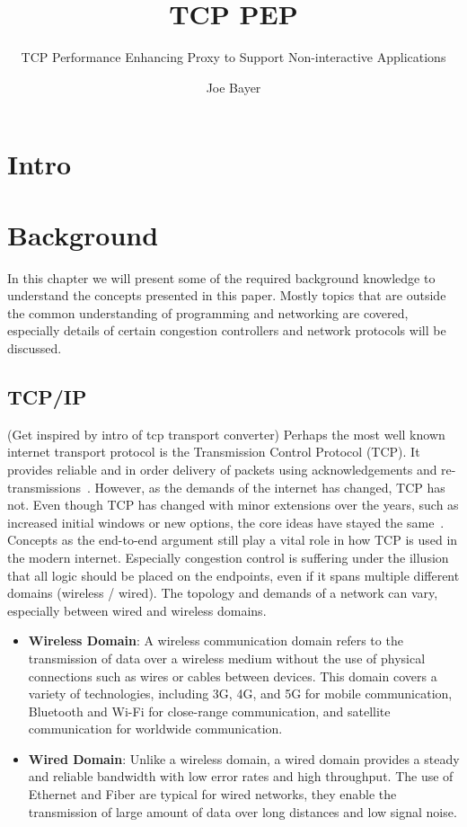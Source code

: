 \documentclass[a4paper,english, 11pt]{report}
\author{Joe Bayer}
\title{TCP PEP}
\subtitle{TCP Performance Enhancing Proxy to
Support Non-interactive Applications}
\begin{document}
\uiomasterfp[program={Informatics: Programming and System Architecture}, supervisors={Michael Welzl\and Kristjon Ciko}]

\tableofcontents

\chapter{Intro}

\chapter{Background}

In this chapter we will present some of the required background knowledge to understand the concepts presented in this paper. Mostly topics that are outside the common understanding of programming and networking are covered, especially details of certain congestion controllers and network protocols will be discussed. 

\section{TCP/IP}
(Get inspired by intro of tcp transport converter)
Perhaps the most well known internet transport protocol is the Transmission Control Protocol (TCP). It provides reliable and in order delivery of packets using acknowledgements and re-transmissions~\cite{Eddy_2022}. However, as the demands of the internet has changed, TCP has not. Even though TCP has changed with minor extensions over the years, such as increased initial windows or new options, the core ideas have stayed the same~\cite{rfc8803}. Concepts as the end-to-end argument still play a vital role in how TCP is used in the modern internet. Especially congestion control is suffering under the illusion that all logic should be placed on the endpoints, even if it spans multiple different domains (wireless / wired). The topology and demands of a network can vary, especially between wired and wireless domains.
\begin{itemize}
  \item \textbf{Wireless Domain}: A wireless communication domain refers to the transmission of data over a wireless medium without the use of physical connections such as wires or cables between devices. This domain covers a variety of technologies, including 3G, 4G, and 5G for mobile communication, Bluetooth and Wi-Fi for close-range communication, and satellite communication for worldwide communication.
  \item \textbf{Wired Domain}: Unlike a wireless domain, a wired domain provides a steady and reliable bandwidth with low error rates and high throughput. The use of Ethernet and Fiber are typical for wired networks, they enable the transmission of large amount of data over long distances and low signal noise. 
\end{itemize}
\end{document}
